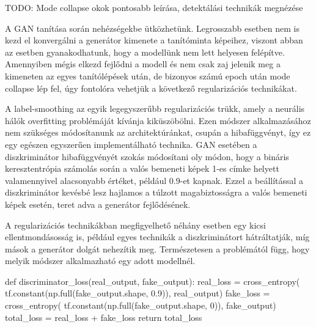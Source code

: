 TODO: Mode collapse okok pontosabb leírása, detektálási technikák megnézése

A GAN tanítása során nehézségekbe ütközhetünk. Legrosszabb esetben nem is kezd el konvergálni a generátor kimenete a tanítóminta képeihez, viszont abban az esetben gyanakodhatunk, hogy a modellünk nem lett helyesen felépítve. Amennyiben mégis elkezd fejlődni a modell és nem csak zaj jelenik meg a kimeneten az egyes tanítólépések után, de bizonyos számú epoch után mode collapse lép fel, úgy fontolóra vehetjük a következő regularizációs technikákat.

A label-smoothing az egyik legegyszerűbb regularizációs trükk, amely a neurális hálók overfitting problémáját kívánja kiküszöbölni. Ezen módszer alkalmazásához nem szükséges módosítanunk az architektúránkat, csupán a hibafüggvényt, így ez egy egészen egyszerűen implementálható technika. GAN esetében a diszkriminátor hibafüggvényét szokás módosítani oly módon, hogy a bináris keresztentrópia számolás során a valós bemeneti képek 1-es címke helyett valamennyivel alacsonyabb értéket, például 0.9-et kapnak. Ezzel a beállítással a diszkriminátor kevésbé lesz hajlamos a túlzott magabiztosságra a valós bemeneti képek esetén, teret adva a generátor fejlődésének.

A regularizációs technikákban megfigyelhető néhány esetben egy kicsi ellentmondásosság is, például egyes technikák a diszkriminátort hátráltatják, míg mások a generátor dolgát nehezítik meg. Természetesen a problémától függ, hogy melyik módszer alkalmazható egy adott modellnél.

\begin{python}
def discriminator_loss(real_output, fake_output):
    real_loss = cross_entropy(
        tf.constant(np.full(fake_output.shape, 0.9)),
        real_output)
    fake_loss = cross_entropy(
        tf.constant(np.full(fake_output.shape, 0)),
        fake_output)
    total_loss = real_loss + fake_loss
    return total_loss
\end{python}



